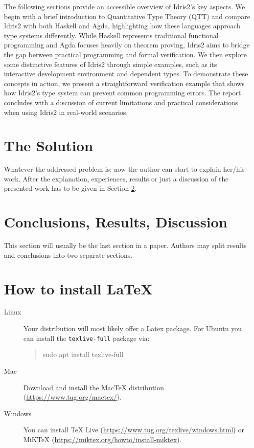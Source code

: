\documentclass[]{rptuseminar}
\newenvironment{displayshellcommand}{%
	\begin{quote}%
	\ttfamily%
}{%
	\end{quote}%
}
\begin{document}
The following sections provide an accessible overview of Idris2's key aspects.
We begin with a brief introduction to Quantitative Type Theory (QTT) and compare Idris2 with both Haskell and Agda, highlighting how these languages approach type systems differently.
While Haskell represents traditional functional programming and Agda focuses heavily on theorem proving, Idris2 aims to bridge the gap between practical programming and formal verification.
We then explore some distinctive features of Idris2 through simple examples, such as its interactive development environment and dependent types.
To demonstrate these concepts in action, we present a straightforward verification example that shows how Idris2's type system can prevent common programming errors.
The report concludes with a discussion of current limitations and practical considerations when using Idris2 in real-world scenarios.

\section{The Solution}
\label{sec:solution}

Whatever the addressed problem is: now the author can start to explain her/his work.
After the explanation, experiences, results or just a discussion of the presented work has to be given in Section \ref{sec:conclusions}.

\section{Conclusions, Results, Discussion}
\label{sec:conclusions}

This section will usually be the last section in a paper.
Authors may split results and conclusions into two separate sections.



\newpage

\section{How to install \LaTeX{}}

\begin{description}
 \item[Linux]
Your distribution will most likely offer a Latex package.
For Ubuntu you can install the \lstinline!texlive-full! package via:

\begin{displayshellcommand}
  sudo apt install texlive-full
\end{displayshellcommand}

\item[Mac]
Download and install the MacTeX distribution (\url{https://www.tug.org/mactex/}).

\item[Windows]
You can install TeX Live (\url{https://www.tug.org/texlive/windows.html}) or MiKTeX (\url{https://miktex.org/howto/install-miktex}).
\end{description}
\end{document}

